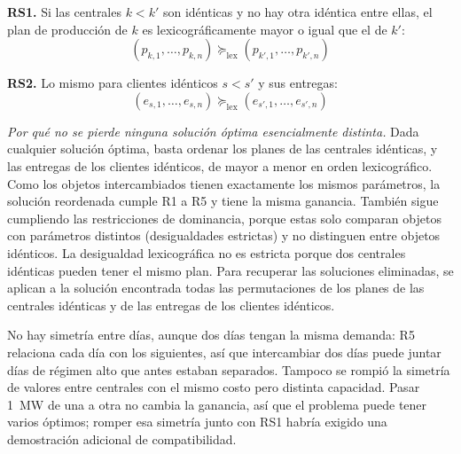 \textbf{RS1.} Si las centrales $k < k'$ son idénticas y no hay otra idéntica entre ellas, el plan de producción de $k$ es lexicográficamente mayor o igual que el de $k'$:
\[
    (p_{k,1}, \dots, p_{k,n}) \succeq_{\mathrm{lex}} (p_{k',1}, \dots, p_{k',n})
\]

\textbf{RS2.} Lo mismo para clientes idénticos $s < s'$ y sus entregas:
\[
    (e_{s,1}, \dots, e_{s,n}) \succeq_{\mathrm{lex}} (e_{s',1}, \dots, e_{s',n})
\]

\textit{Por qué no se pierde ninguna solución óptima esencialmente distinta.} Dada cualquier solución óptima, basta ordenar los planes de las centrales idénticas, y las entregas de los clientes idénticos, de mayor a menor en orden lexicográfico. Como los objetos intercambiados tienen exactamente los mismos parámetros, la solución reordenada cumple R1 a R5 y tiene la misma ganancia. También sigue cumpliendo las restricciones de dominancia, porque estas solo comparan objetos con parámetros distintos (desigualdades estrictas) y no distinguen entre objetos idénticos. La desigualdad lexicográfica no es estricta porque dos centrales idénticas pueden tener el mismo plan. Para recuperar las soluciones eliminadas, se aplican a la solución encontrada todas las permutaciones de los planes de las centrales idénticas y de las entregas de los clientes idénticos.

No hay simetría entre días, aunque dos días tengan la misma demanda: R5 relaciona cada día con los siguientes, así que intercambiar dos días puede juntar días de régimen alto que antes estaban separados. Tampoco se rompió la simetría de valores entre centrales con el mismo costo pero distinta capacidad. Pasar 1~MW de una a otra no cambia la ganancia, así que el problema puede tener varios óptimos; romper esa simetría junto con RS1 habría exigido una demostración adicional de compatibilidad.
